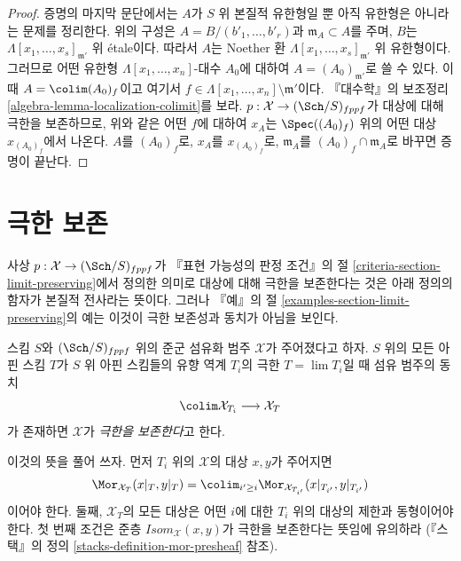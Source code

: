\begin{proof}
\medskip\noindent
증명의 마지막 문단에서는 $A$가 $S$ 위 본질적 유한형일 뿐 아직 유한형은
아니라는 문제를 정리한다. 위의 구성은
$A = B/(b'_1, \ldots, b'_r)$과 $\mathfrak m_A \subset A$를 주며,
$B$는 $\Lambda[x_1, \ldots, x_s]_{\mathfrak m'}$ 위 \'etale이다.
따라서 $A$는 Noether 환
$\Lambda[x_1, \ldots, x_s]_{\mathfrak m'}$ 위 유한형이다.
그러므로 어떤 유한형 $\Lambda[x_1, \ldots, x_n]$-대수 $A_0$에 대하여
$A = (A_0)_{\mathfrak m'}$로 쓸 수 있다.
이때
$A = \colim (A_0)_f$이고 여기서
$f \in \Lambda[x_1, \ldots, x_n] \setminus \mathfrak m'$이다.
『대수학』의 보조정리 \ref{algebra-lemma-localization-colimit}를 보라.
$p : \mathcal{X} \to (\Sch/S)_{fppf}$가 대상에 대해 극한을 보존하므로,
위와 같은 어떤 $f$에 대하여 $x_A$는 $\Spec((A_0)_f)$ 위의 어떤 대상
$x_{(A_0)_f}$에서 나온다. $A$를 $(A_0)_f$로, $x_A$를
$x_{(A_0)_f}$로, $\mathfrak m_A$를
$(A_0)_f \cap \mathfrak m_A$로 바꾸면 증명이 끝난다.
\end{proof}





\section{극한 보존}
\label{section-limits}

\noindent
사상 $p : \mathcal{X} \to (\Sch/S)_{fppf}$가 『표현 가능성의 판정 조건』의
절 \ref{criteria-section-limit-preserving}에서 정의한 의미로 대상에 대해
극한을 보존한다는 것은 아래 정의의 함자가 본질적 전사라는 뜻이다.
그러나 『예』의 절 \ref{examples-section-limit-preserving}의 예는 이것이
극한 보존성과 동치가 아님을 보인다.

\begin{definition}
\label{definition-limit-preserving}
스킴 $S$와 $(\Sch/S)_{fppf}$ 위의 준군 섬유화 범주 $\mathcal{X}$가
주어졌다고 하자. $S$ 위의 모든 아핀 스킴 $T$가 $S$ 위 아핀 스킴들의
유향 역계 $T_i$의 극한 $T = \lim T_i$일 때 섬유 범주의 동치
$$
\colim \mathcal{X}_{T_i} \longrightarrow \mathcal{X}_T
$$
가 존재하면 $\mathcal{X}$가 {\it 극한을 보존한다}고 한다.
\end{definition}

\noindent
이것의 뜻을 풀어 쓰자. 먼저 $T_i$ 위의 $\mathcal{X}$의 대상 $x, y$가
주어지면
$$
\Mor_{\mathcal{X}_T}(x|_T, y|_T) =
\colim_{i' \geq i} \Mor_{\mathcal{X}_{T_{i'}}}(x|_{T_{i'}}, y|_{T_{i'}})
$$
이어야 한다. 둘째, $\mathcal{X}_T$의 모든 대상은 어떤 $i$에 대한
$T_i$ 위의 대상의 제한과 동형이어야 한다. 첫 번째 조건은 준층
$\mathit{Isom}_\mathcal{X}(x, y)$가 극한을 보존한다는 뜻임에 유의하라
(『스택』의 정의 \ref{stacks-definition-mor-presheaf} 참조).


